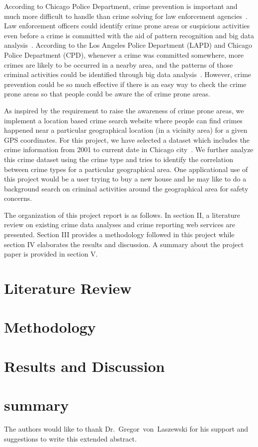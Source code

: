According to Chicago Police Department, crime prevention is important and much 
more difficult to handle than crime solving for law enforcement 
agencies~\cite{hid-sp18-409-www-cpd}. Law enforcement officers could identify 
crime prone areas or suspicious activities 
even before a crime is committed with the aid of pattern recognition and 
big data analysis~\cite{hid-sp18-409-nath2006crime, hid-sp18-409-gera2014city}. 
According to the Los Angeles Police Department (LAPD) and 
Chicago Police Department (CPD), whenever a crime was committed somewhere, more 
crimes are likely to be occurred in a nearby area, and the patterns of those 
criminal activities could be identified through big data 
analysis~\cite{hid-sp18-409-www-cpd, hid-sp18-409-www-lapd}. However, 
crime prevention could be so much effective if there is an easy way to check 
the crime prone areas so that people could be aware the of crime prone 
areas.

As inspired by the requirement to raise the awareness of crime prone areas, we 
implement a location based crime search website where people can find 
crimes happened near a particular geographical location (in a vicinity area) 
for a given GPS coordinates. For this project, we have selected a dataset which 
includes the crime information from 2001 to current date in Chicago 
city~\cite{hid-sp18-409-www-data.gov}. We further analyze this crime dataset 
using the crime type and tries to identify the correlation between crime 
types for a particular geographical area. One applicational use of this project 
would be a user trying to buy a new house and he may like to do a background 
search on criminal activities around the geographical area for safety concerns.

The organization of this project report is as follows. In section II, a 
literature review on existing crime data analyses and crime reporting web 
services are presented. Section III provides a methodology followed in this 
project while section IV elaborates the results and discussion. A summary about 
the project paper is provided in section V.

\section{Literature Review}

\section{Methodology}

\section{Results and Discussion}

\section{summary} 

\begin{acks}
	
	The authors would like to thank Dr.~Gregor~von~Laszewski for his support and
	suggestions to write this extended abstract.
	
\end{acks}


 